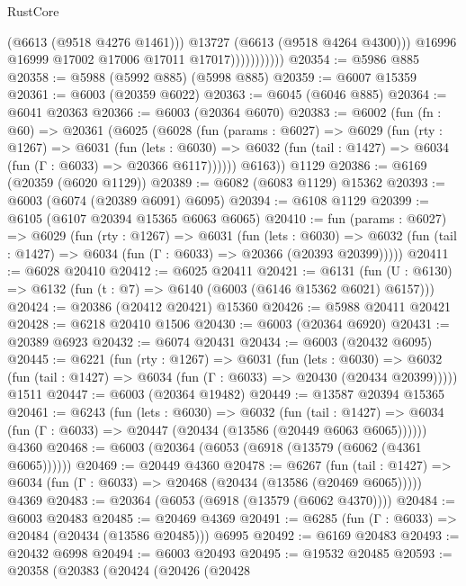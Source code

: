 \begin{lexlean}{RustCore}
\begin{coremodule}
                              (@6613 (@9518 @4276 @1461)))
                            @13727
                            (@6613 (@9518 @4264 @4300)))
                          @16996
                          @16999
                          @17002
                          @17006
                          @17011
                          @17017)))))))))))
@20354 := @5986 @885
@20358 := @5988 (@5992 @885) (@5998 @885)
@20359 := @6007 @15359
@20361 := @6003 (@20359 @6022)
@20363 := @6045 (@6046 @885)
@20364 := @6041 @20363
@20366 := @6003 (@20364 @6070)
@20383 := @6002
    (fun (fn : @60) =>
    @20361
      (@6025
        (@6028
          (fun (params : @6027) =>
          @6029
            (fun (rty : @1267) =>
            @6031
              (fun (lets : @6030) =>
              @6032 (fun (tail : @1427) => @6034 (fun (Γ : @6033) => @20366 @6117))))))
        @6163))
    @1129
@20386 := @6169 (@20359 (@6020 @1129))
@20389 := @6082 (@6083 @1129) @15362
@20393 := @6003 (@6074 (@20389 @6091) @6095)
@20394 := @6108 @1129
@20399 := @6105 (@6107 @20394 @15365 @6063 @6065)
@20410 := fun (params : @6027) =>
  @6029
    (fun (rty : @1267) =>
    @6031
      (fun (lets : @6030) =>
      @6032 (fun (tail : @1427) => @6034 (fun (Γ : @6033) => @20366 (@20393 @20399)))))
@20411 := @6028 @20410
@20412 := @6025 @20411
@20421 := @6131
    (fun (U : @6130) => @6132 (fun (t : @7) => @6140 (@6003 (@6146 @15362 @6021) @6157)))
@20424 := @20386 (@20412 @20421) @15360
@20426 := @5988 @20411 @20421
@20428 := @6218 @20410 @1506
@20430 := @6003 (@20364 @6920)
@20431 := @20389 @6923
@20432 := @6074 @20431
@20434 := @6003 (@20432 @6095)
@20445 := @6221
    (fun (rty : @1267) =>
    @6031
      (fun (lets : @6030) =>
      @6032 (fun (tail : @1427) => @6034 (fun (Γ : @6033) => @20430 (@20434 @20399)))))
    @1511
@20447 := @6003 (@20364 @19482)
@20449 := @13587 @20394 @15365
@20461 := @6243
    (fun (lets : @6030) =>
    @6032
      (fun (tail : @1427) =>
      @6034 (fun (Γ : @6033) => @20447 (@20434 (@13586 (@20449 @6063 @6065))))))
    @4360
@20468 := @6003 (@20364 (@6053 (@6918 (@13579 (@6062 (@4361 @6065))))))
@20469 := @20449 @4360
@20478 := @6267
    (fun (tail : @1427) => @6034 (fun (Γ : @6033) => @20468 (@20434 (@13586 (@20469 @6065)))))
    @4369
@20483 := @20364 (@6053 (@6918 (@13579 (@6062 @4370))))
@20484 := @6003 @20483
@20485 := @20469 @4369
@20491 := @6285 (fun (Γ : @6033) => @20484 (@20434 (@13586 @20485))) @6995
@20492 := @6169 @20483
@20493 := @20432 @6998
@20494 := @6003 @20493
@20495 := @19532 @20485
@20593 := @20358
    (@20383
      (@20424
        (@20426
          (@20428

\end{coremodule}
\end{lexlean}
